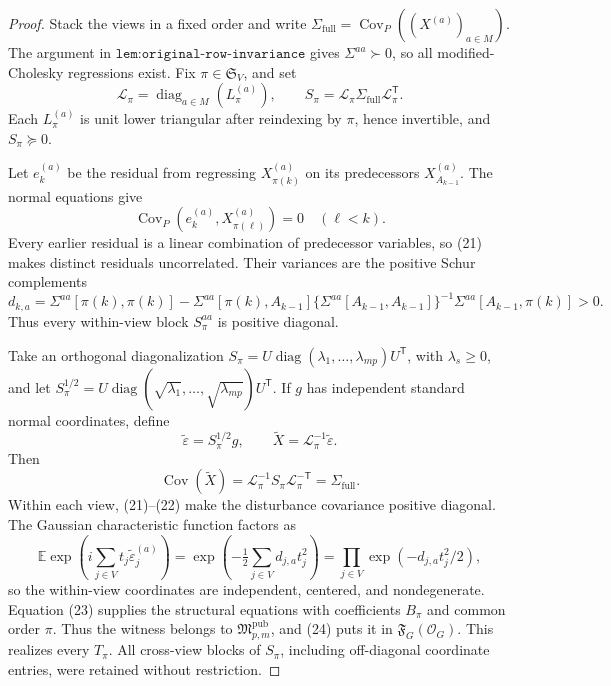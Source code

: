 \documentclass{article}
\begin{document}
\begin{proof}
Stack the views in a fixed order and write \(\Sigma_{\mathrm{full}}=\operatorname{Cov}_P((X^{(a)})_{a\in M})\).  The argument in \(\texttt{lem:original-row-invariance}\) gives \(\Sigma^{aa}\succ0\), so all modified-Cholesky regressions exist.  Fix \(\pi\in\mathfrak S_V\), and set
\[
 \mathcal L_\pi=\operatorname{diag}_{a\in M}(L_\pi^{(a)}),
 \qquad S_\pi=\mathcal L_\pi\Sigma_{\mathrm{full}}
 \mathcal L_\pi^{\mathsf T}.
 \tag{20}
\]
Each \(L_\pi^{(a)}\) is unit lower triangular after reindexing by \(\pi\), hence invertible, and \(S_\pi\succeq0\).

Let \(e_k^{(a)}\) be the residual from regressing \(X_{\pi(k)}^{(a)}\) on its predecessors \(X_{A_{k-1}}^{(a)}\).  The normal equations give
\[
 \operatorname{Cov}_P(e_k^{(a)},X_{\pi(\ell)}^{(a)})=0
 \quad(\ell<k).
 \tag{21}
\]
Every earlier residual is a linear combination of predecessor variables, so (21) makes distinct residuals uncorrelated.  Their variances are the positive Schur complements
\[
 d_{k,a}=\Sigma^{aa}[\pi(k),\pi(k)]-
 \Sigma^{aa}[\pi(k),A_{k-1}]
 \{\Sigma^{aa}[A_{k-1},A_{k-1}]\}^{-1}
 \Sigma^{aa}[A_{k-1},\pi(k)]>0.
 \tag{22}
\]
Thus every within-view block \(S_\pi^{aa}\) is positive diagonal.

Take an orthogonal diagonalization \(S_\pi=U\operatorname{diag}(\lambda_1,\ldots,\lambda_{mp})U^{\mathsf T}\), with \(\lambda_s\ge0\), and let \(S_\pi^{1/2}=U\operatorname{diag}(\sqrt{\lambda_1},\ldots,\sqrt{\lambda_{mp}})U^{\mathsf T}\).  If \(g\) has independent standard normal coordinates, define
\[
 \widetilde\varepsilon=S_\pi^{1/2}g,
 \qquad \widetilde X=\mathcal L_\pi^{-1}\widetilde\varepsilon.
 \tag{23}
\]
Then
\[
 \operatorname{Cov}(\widetilde X)
 =\mathcal L_\pi^{-1}S_\pi\mathcal L_\pi^{-\mathsf T}
 =\Sigma_{\mathrm{full}}.
 \tag{24}
\]
Within each view, (21)--(22) make the disturbance covariance positive diagonal.  The Gaussian characteristic function factors as
\[
 \mathbb E\exp\!\left(i\sum_{j\in V}t_j\widetilde\varepsilon_j^{(a)}\right)
 =\exp\!\left(-\tfrac12\sum_{j\in V}d_{j,a}t_j^2\right)
 =\prod_{j\in V}\exp(-d_{j,a}t_j^2/2),
\]
so the within-view coordinates are independent, centered, and nondegenerate.  Equation (23) supplies the structural equations with coefficients \(B_\pi\) and common order \(\pi\).  Thus the witness belongs to \(\mathfrak M_{p,m}^{\mathrm{pub}}\), and (24) puts it in \(\mathfrak F_G(\mathcal O_G)\).  This realizes every \(T_\pi\).  All cross-view blocks of \(S_\pi\), including off-diagonal coordinate entries, were retained without restriction.


\end{proof}
\end{document}
